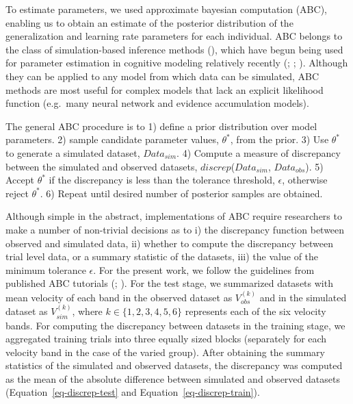 \documentclass[
  letterpaper,
  DIV=11,
  numbers=noendperiod,
  oneside]{scrartcl}
\begin{document}
To estimate parameters, we used approximate bayesian computation (ABC),
enabling us to obtain an estimate of the posterior distribution of the
generalization and learning rate parameters for each individual. ABC
belongs to the class of simulation-based inference methods
(), which have begun being used for parameter estimation in
cognitive modeling relatively recently
(;
; ). Although they can be applied to any model from which
data can be simulated, ABC methods are most useful for complex models
that lack an explicit likelihood function (e.g.~many neural network and
evidence accumulation models).

The general ABC procedure is to 1) define a prior distribution over
model parameters. 2) sample candidate parameter values, \(\theta^*\),
from the prior. 3) Use \(\theta^*\) to generate a simulated dataset,
\(Data_{sim}\). 4) Compute a measure of discrepancy between the
simulated and observed datasets, \(discrep\)(\(Data_{sim}\),
\(Data_{obs}\)). 5) Accept \(\theta^*\) if the discrepancy is less than
the tolerance threshold, \(\epsilon\), otherwise reject \(\theta^*\). 6)
Repeat until desired number of posterior samples are obtained.

Although simple in the abstract, implementations of ABC require
researchers to make a number of non-trivial decisions as to i) the
discrepancy function between observed and simulated data, ii) whether to
compute the discrepancy between trial level data, or a summary statistic
of the datasets, iii) the value of the minimum tolerance \(\epsilon\).
For the present work, we follow the guidelines from published ABC
tutorials
(;
). For the test stage, we summarized datasets with mean
velocity of each band in the observed dataset as \(V_{obs}^{(k)}\) and
in the simulated dataset as \(V_{sim}^{(k)}\), where
\(k \in \{1, 2, 3, 4, 5, 6\}\) represents each of the six velocity
bands. For computing the discrepancy between datasets in the training
stage, we aggregated training trials into three equally sized blocks
(separately for each velocity band in the case of the varied group).
After obtaining the summary statistics of the simulated and observed
datasets, the discrepancy was computed as the mean of the absolute
difference between simulated and observed datasets
(Equation~\ref{eq-discrep-test} and Equation~\ref{eq-discrep-train}).
\end{document}
